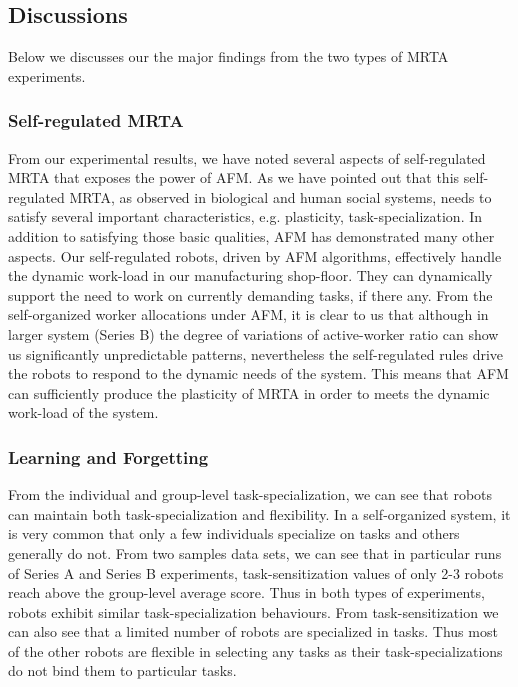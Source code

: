 \documentclass[smallcondensed]{svjour3}
\begin{document}
\subsection{Discussions}
\label{afm:discuss}
Below we discusses our the major findings from the two types of MRTA experiments.
\subsubsection{Self-regulated MRTA}
From our experimental results, we have noted several aspects of self-regulated MRTA that exposes the power of AFM. As we have pointed out that this self-regulated MRTA, as observed in biological and human social systems, needs to satisfy several important characteristics, e.g. plasticity, task-specialization. In addition to satisfying those basic qualities, AFM has demonstrated many other aspects. Our self-regulated robots, driven by AFM algorithms, effectively handle the dynamic work-load in our manufacturing shop-floor. They can dynamically support the need to work on currently demanding tasks, if there any. From the self-organized worker allocations under AFM, it is clear to us that although in larger system (Series B) the degree of variations of active-worker ratio can show us significantly unpredictable patterns, nevertheless the self-regulated rules drive the robots to respond to the dynamic needs of the system. This means that AFM can sufficiently produce the plasticity of MRTA in order to meets the dynamic work-load of the system.
\subsubsection{Learning and Forgetting}
From the individual and group-level task-specialization, we can see that robots can maintain both task-specialization and flexibility. In a self-organized system, it is very common that only a few individuals specialize on tasks and others generally do not. From two samples data sets, we can see that in particular runs of Series A and Series B experiments, task-sensitization values of  only 2-3 robots reach above the group-level average score. Thus in both types of experiments, robots exhibit similar task-specialization behaviours. From task-sensitization we can also see that a limited number of robots are specialized in tasks. Thus most of the other robots are flexible in selecting any tasks as their task-specializations do not bind them to particular tasks.
\end{document}
